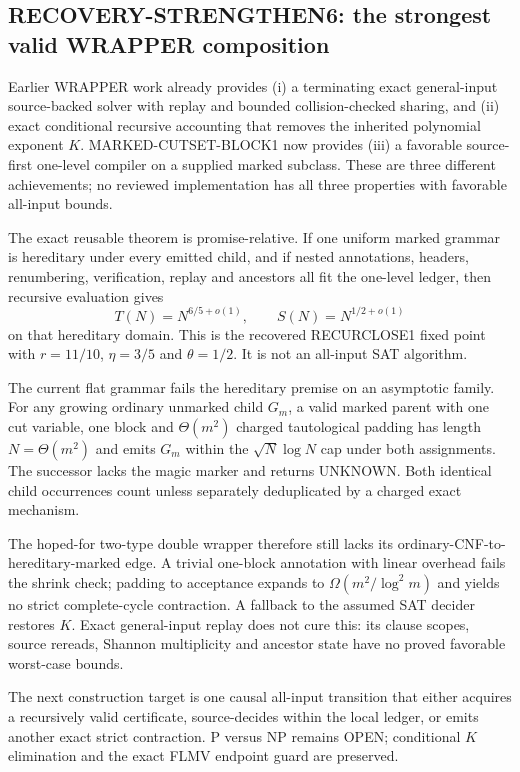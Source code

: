 \subsection*{RECOVERY-STRENGTHEN6: the strongest valid WRAPPER composition}

Earlier WRAPPER work already provides (i) a terminating exact general-input
source-backed solver with replay and bounded collision-checked sharing, and
(ii) exact conditional recursive accounting that removes the inherited
polynomial exponent $K$.  MARKED-CUTSET-BLOCK1 now provides (iii) a favorable
source-first one-level compiler on a supplied marked subclass.  These are
three different achievements; no reviewed implementation has all three
properties with favorable all-input bounds.

The exact reusable theorem is promise-relative.  If one uniform marked grammar
is hereditary under every emitted child, and if nested annotations, headers,
renumbering, verification, replay and ancestors all fit the one-level ledger,
then recursive evaluation gives
\[
 T(N)=N^{6/5+o(1)},\qquad S(N)=N^{1/2+o(1)}
\]
on that hereditary domain.  This is the recovered RECURCLOSE1 fixed point
with $r=11/10$, $\eta=3/5$ and $\theta=1/2$.  It is not an all-input SAT
algorithm.

The current flat grammar fails the hereditary premise on an asymptotic family.
For any growing ordinary unmarked child $G_m$, a valid marked parent with one
cut variable, one block and $\Theta(m^2)$ charged tautological padding has
length $N=\Theta(m^2)$ and emits $G_m$ within the $\sqrt N\log N$ cap under
both assignments.  The successor lacks the magic marker and returns UNKNOWN.
Both identical child occurrences count unless separately deduplicated by a
charged exact mechanism.

The hoped-for two-type double wrapper therefore still lacks its
ordinary-CNF-to-hereditary-marked edge.  A trivial one-block annotation with
linear overhead fails the shrink check; padding to acceptance expands to
$\Omega(m^2/\log^2m)$ and yields no strict complete-cycle contraction.  A
fallback to the assumed SAT decider restores $K$.  Exact general-input replay
does not cure this: its clause scopes, source rereads, Shannon multiplicity
and ancestor state have no proved favorable worst-case bounds.

The next construction target is one causal all-input transition that either
acquires a recursively valid certificate, source-decides within the local
ledger, or emits another exact strict contraction.  P versus NP remains OPEN;
conditional $K$ elimination and the exact FLMV endpoint guard are preserved.

